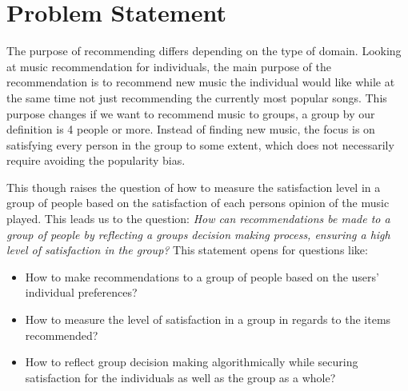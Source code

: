 	\section{Problem Statement}
The purpose of recommending differs depending on the type of domain. Looking at music recommendation for individuals, the main purpose of the recommendation is to recommend new music the individual would like while at the same time not just recommending the currently most popular songs. This purpose changes if we want to recommend music to groups, a group by our definition is 4 people or more. Instead of finding new music, the focus is on satisfying every person in the group to some extent, which does not necessarily require avoiding the popularity bias. 

This though raises the question of how to measure the satisfaction level in a group of people based on the satisfaction of each persons opinion of the music played. This leads us to the question:
\textit{How can recommendations be made to a group of people by reflecting a groups decision making process, ensuring a high level of satisfaction in the group?} This statement opens for questions like:
\begin{itemize}
\item How to make recommendations to a group of people based on the users' individual preferences?
\item How to measure the level of satisfaction in a group in regards to the items recommended?
\item How to reflect group decision making algorithmically while securing satisfaction for the individuals as well as the group as a whole?
\end{itemize}